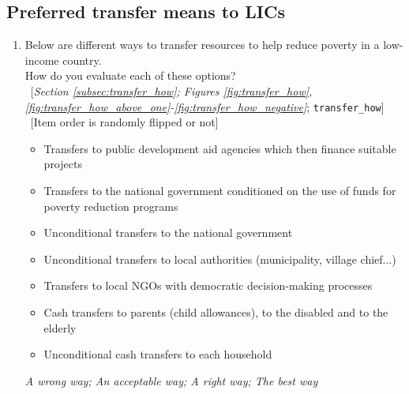  \subsection*{Preferred transfer means to LICs} 
 \begin{enumerate}[resume] 
\item  \label{q:transfer_how} Below are different ways to transfer resources to help reduce poverty in a low-income country.~\\How do you evaluate each of these options?\\ 
~[\textit{Section \ref{subsec:transfer_how}; Figures \ref{fig:transfer_how}, \ref{fig:transfer_how_above_one}-\ref{fig:transfer_how_negative}}; 
\verb|transfer_how|]
~[Item order is randomly flipped or not]
\begin{itemize}
  \item Transfers to public development aid agencies which then finance suitable projects
  \item Transfers to the national government conditioned on the use of funds for poverty reduction programs
  \item Unconditional transfers to the national government
  \item Unconditional transfers to local authorities (municipality, village chief...)
  \item Transfers to local NGOs with democratic decision-making processes
  \item Cash transfers to parents (child allowances), to the disabled and to the elderly
  \item Unconditional cash transfers to each household
\end{itemize}
\textit{A wrong way; An acceptable way; A right way; The best way}

\end{enumerate} 


